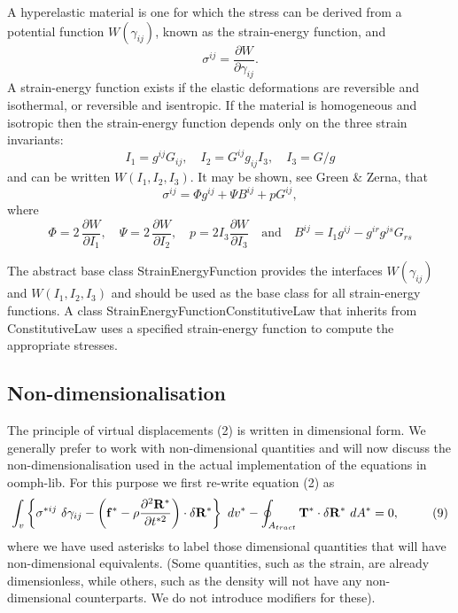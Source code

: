 A hyperelastic material is one for which the stress can be derived from a potential function $ W(\gamma_{ij})$, known as the strain-\/energy function, and \[ \sigma^{ij} = \frac{\partial W}{\partial \gamma_{ij}}. \] A strain-\/energy function exists if the elastic deformations are reversible and isothermal, or reversible and isentropic. If the material is homogeneous and isotropic then the strain-\/energy function depends only on the three strain invariants\+: \[ I_{1} = g^{ij} G_{ij},\quad I_{2} = G^{ij} g_{ij} I_{3},\quad I_{3} = G/g \] and can be written $W(I_{1},I_{2},I_{3})$. It may be shown, see Green \& Zerna, that \[ \sigma^{ij} = \Phi g^{ij} + \Psi B^{ij} + p G^{ij},\] where \[ \Phi = 2\, \frac{\partial W}{\partial I_{1}},\quad \Psi = 2\, \frac{\partial W}{\partial I_{2}},\quad p = 2 I_{3} \frac{\partial W}{\partial I_{3}} \quad\mbox{and}\quad B^{ij} = I_{1} g^{ij} - g^{ir}g^{js}G_{rs} \]

The abstract base class {\ttfamily Strain\+Energy\+Function} provides the interfaces $ W(\gamma_{ij}) $ and $ W(I_{1},I_{2},I_{3}) $ and should be used as the base class for all strain-\/energy functions. A class {\ttfamily Strain\+Energy\+Function\+Constitutive\+Law} that inherits from {\ttfamily Constitutive\+Law} uses a specified strain-\/energy function to compute the appropriate stresses.



\hypertarget{index_non-dim_solid}{}\subsection{Non-\/dimensionalisation}\label{index_non-dim_solid}
The principle of virtual displacements (2) is written in dimensional form. We generally prefer to work with non-\/dimensional quantities and will now discuss the non-\/dimensionalisation used in the actual implementation of the equations in {\ttfamily oomph-\/lib}. For this purpose we first re-\/write equation (2) as \[ \int_{v} \left\{ \sigma^{*ij} \ \delta \gamma_{ij} - \left( {\bf f}^* - \rho \frac{\partial^2 {\bf R}^*}{\partial t^{*2}} \right) \cdot \delta {\bf R}^* \right\} \ dv^* - \oint_{A_{tract}} {\bf T}^* \cdot \delta {\bf R}^* \ dA^* =0, \ \ \ \ \ \ \ \ (9) \] where we have used asterisks to label those dimensional quantities that will have non-\/dimensional equivalents. (Some quantities, such as the strain, are already dimensionless, while others, such as the density will not have any non-\/dimensional counterparts. We do not introduce modifiers for these).

